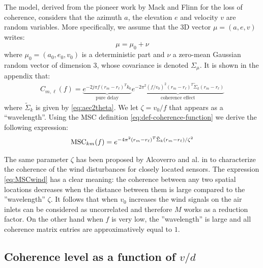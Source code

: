 The model, derived from the pioneer work by Mack and Flinn \cite{mack_flinn:1971} for the loss of coherence, considers that the azimuth $a$, the elevation $e$ and velocity $v$ are random variables. More specifically, we assume that the 3D vector $\mu=(a,e,v)$ writes:
\begin{equation}
 \label{eq:randomnesswn}
 \mu=\mu_{0}+\nu
\end{equation} 
where $\mu_{0}=(a_{0},e_{0},v_{0})$ is a deterministic part and $\nu$ a zero-mean Gaussian random vector of dimension 3, whose covariance is denoted $\Sigma_{\mu}$. It is shown in the appendix that:
\begin{eqnarray}
\label{eq:Cfr1r2Gaussian}
C_{m,\ell}(f)=
\underbrace{e^{-2j\pi f(r_{m}-r_{\ell})^{T}k_{0}}}_{\text{pure delay}}
 \underbrace{e^{-2\pi^{2}(f/v_0)^{2}(r_{m}-r_{\ell})^{T}
                 \tilde \Sigma_{k}(r_{m}-r_{\ell})}}_{\text{coherence effect}}
 \end{eqnarray}
where $\tilde \Sigma_{k}$ is given by \eqref{eq:aec2theta}. We let $\zeta=v_0/f$ that appears as a ``wavelength''. Using the MSC definition \eqref{eq:def-coherence-function}  we derive the following expression:
\begin{eqnarray}
\label{eq:MSCwind}
\mathrm{MSC}_{km}(f)=
e^{-4\pi^{2}(r_{m}-r_{\ell})^{T}
                 \tilde \Sigma_{k}(r_{m}-r_{\ell})/\zeta^{2}}
 \end{eqnarray}

The same parameter $\zeta$ has been proposed by Alcoverro and al. in \cite{alcoverro:2005} to characterize the coherence of the wind disturbances for closely located sensors. The expression \eqref{eq:MSCwind} has a clear meaning: the coherence  between any two spatial locations decreases when the distance between them is large compared to the ''wavelength'' $\zeta$. It follows that when $v_{0}$ increases the wind signals on the air inlets can be considered as uncorrelated and therefore $M$ works as a reduction factor. On the other hand when $f$ is very low, the ''wavelength'' is large and all coherence matrix entries are approximatively equal to $1$. 



\subsection{Coherence level as a function of $v/d$}

